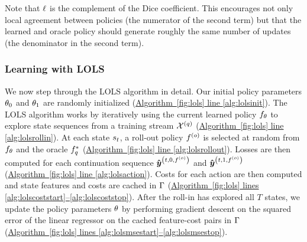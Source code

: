 Note that $\ell$ is the complement of the Dice coefficient.
This encourages not only local agreement between policies (the numerator of
the second term) but that the learned and oracle policy should generate
roughly the same number of updates (the denominator in the second term).



\subsubsection{Learning with LOLS}

We now step through the LOLS algorithm in detail.
Our initial policy parameters $\theta_0$ and $\theta_1$ are randomly initialized (\hyperref[fig:lols]{Algorithm~\ref{fig:lols} line \ref{alg:lolsinit}}). 
The LOLS algorithm works by iteratively using the current learned policy
$f_{\theta}$ to explore state sequences from a training stream $\mathcal{X}^{(q)}$
(\hyperref[fig:lols]{Algorithm~\ref{fig:lols} line \ref{alg:lolsrollin}}).
At each state $s_t$, a roll-out policy $f^{(o)}$ is selected
at random from $f_{\theta}$ and the oracle $f^*_{q}$
(\hyperref[fig:lols]{Algorithm~\ref{fig:lols} line \ref{alg:lolsrollout}}).
Losses
are then computed for each continuation sequence $\boldsymbol{\hat{\boldsymbol{y}}}^{\left(t,0,f^{(o)}\right)}$ and 
$\boldsymbol{\hat{\boldsymbol{y}}}^{\left(t,1,f^{(o)}\right)}$
(\hyperref[fig:lols]{Algorithm~\ref{fig:lols} line \ref{alg:lolsaction}}).
Costs for each action are then computed and state features and costs are 
cached in $\Gamma$ 
(\hyperref[fig:lols]{Algorithm~\ref{fig:lols} lines \ref{alg:lolscoststart}--\ref{alg:lolscoststop}}).
After the roll-in has explored all $T$ states, we update the policy
parameters $\theta$ by performing gradient descent on the squared
error of the linear regressor on the cached feature-cost pairs
in $\Gamma$ 
(\hyperref[fig:lols]{Algorithm~\ref{fig:lols} lines \ref{alg:lolsmsestart}--\ref{alg:lolsmsestop}}).
